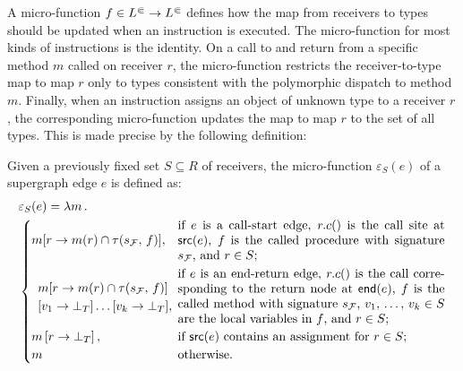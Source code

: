 
A micro-function $f\in L^\Subset\to L^\Subset$ defines how the map from receivers to types should
be updated when an instruction is executed.
The micro-function for most kinds of instructions is the identity.
On a call to and return from a specific method $m$ called on receiver $r$,
the micro-function restricts the receiver-to-type map to map $r$ only to
types consistent with the polymorphic dispatch to method $m$.
Finally, when an instruction assigns an object of unknown type to a receiver
$r$, the corresponding micro-function updates the map to map $r$ to the
set of all types. This is made precise by the following definition:
\begin{definition}\label{def:microfn}
Given a previously fixed set $S \subseteq R$ of receivers, the micro-function $\varepsilon_S(e)$
of a supergraph edge $e$ is defined as:
  \begin{align}\label{eq:varepsilon}
      &\varepsilon_S(e)= \lambda m\,.\,\\
        &\begin{cases}
            m[r\to m(r)\cap \tau(s_\mathcal F,\,f)],
            &\text{\parbox{75mm}{
                if $e$ is a call-start edge, $r.c()$ is
                the call site at $\src e$, $f$ is the called
                procedure with signature $s_\mathcal F$,
                and $r\in S$;}}\\[3ex]
        \parbox{30mm}{\[\begin{array}{l}
                m[r\to m(r)\cap \tau(s_\mathcal F,\,f)]\\
            [v_1\to\bot_T] \ldots [v_k\to\bot_T],
        \end{array}
        \]
        }
        &
        \text{\parbox{75mm}{
                if $e$ is an end-return edge,
                $r.c()$ is the call
                corresponding to the return node
                at $\target e$,
                $f$ is the called method with
                signature $s_\mathcal F$,
                $v_1,\,\dots,\,v_k\in S$ are the local variables
                in $f$,
                and $r\in S$;}}\\
            m\left[r\to \bot_T\right],
            &\text{\parbox{75mm}{if $\src e$ contains an assignment
                    for $r\in S$;}}\\
            m
                &\text{otherwise.}
        \end{cases}
  \end{align}
\end{definition}

